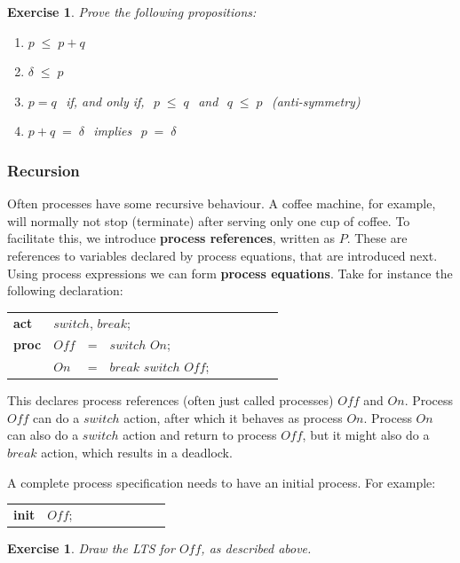 \documentclass[a4paper,fleqn]{article}
\makeatletter
\newtheorem{thexercise}[thdefinition]{Exercise}
\newenvironment{exercise}
  {\begin{thexercise}\em}
  {\end{thexercise}}
\newcommand{\f}[1]{\ensuremath{\mathit{#1}}}
\newcommand{\deffont}[1]{\textbf{#1}}
\newcommand{\seq}{\mathbin{\cdot}}
\newcommand{\alt}{\mathbin{+}}
\def\ax{=}
\def\axle{\le}
\newenvironment{mcrl2}%
{\par\bigskip\noindent%
 \begin{tabular}{@{}>{\bf}p{2.3em}L@{\ }L@{\ }L@{\ }L@{\ }L@{\ }L@{\ }L@{\ }L}%
}%
{\end{tabular}\bigskip\par%
}
\makeatother
\begin{document}
\begin{exercise}\label{exc.incl}
Prove the following propositions:
\begin{enumerate}
\item $p\; \axle\; p\alt q$
\item $\delta\;\axle\; p$
\item $p\ax q\ \,$ if, and only if, $\ \,p\;\axle\;q\ \,$ and $\ \,q\;\axle\; p\ \,$ \label{exc.incl.split} (anti-symmetry)
\item $p\alt q\;\ax\;\delta\ \,$ implies $\ \,p\;\ax\;\delta$
\end{enumerate}
\end{exercise}

\subsubsection{Recursion}
\label{sssec:recursion}

Often processes have some recursive behaviour. A coffee machine, for example,
will normally not stop (terminate) after serving only one cup of coffee. To
facilitate this, we introduce \deffont{process references}, written as $P$.
These are references to variables declared by process equations, that are
introduced next. Using process expressions we can form \deffont{process
equations}. Take for instance the following declaration:

\begin{mcrl2}
act & \multicolumn{3}{L}{\f{switch}, \f{break};} \\
proc & \f{Off} & = & \f{switch} \seq \f{On}; \\
     & \f{On}  & = & \f{break} \seq \delta \alt \f{switch} \seq \f{Off}; \\
\end{mcrl2}

\noindent
This declares process references (often just called processes) $\f{Off}$ and
$\f{On}$. Process $\f{Off}$ can do a $\f{switch}$ action, after which it
behaves as process $\f{On}$. Process $\f{On}$ can also do a $\f{switch}$ action
and return to process $\f{Off}$, but it might also do a $\f{break}$ action,
which results in a deadlock.

A complete process specification needs to have an initial process. For example:
\begin{mcrl2}
init & $\f{Off}$;
\end{mcrl2}

\begin{exercise}\label{exc.rec}
Draw the LTS for $\f{Off}$, as described above.
\end{exercise}
\end{document}
